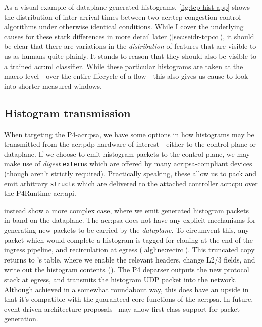 As a visual example of dataplane-generated histograms, \cref{fig:tcp-hist-app} shows the distribution of inter-arrival times between two \gls{acr:tcp} congestion control algorithms under otherwise identical conditions.
While I cover the underlying causes for these stark differences in more detail later (\cref{sec:seidr-tcpcc}), it should be clear that there are variations in the \emph{distribution} of features that are visible to us as humans quite plainly.
It stands to reason that they should also be visible to a trained \gls{acr:ml} classifier.
While these particular histograms are taken at the macro level---over the entire lifecycle of a flow---this also gives us cause to look into shorter measured windows.

\subsection{Histogram transmission}\label{sec:seidr-histo-tx}
When targeting the P4-\gls{acr:psa}, we have some options in how histograms may be transmitted from the \gls{acr:pdp} hardware of interest---either to the control plane or dataplane.
If we choose to emit histogram packets to the control plane, we may make use of \emph{digest} \texttt{extern}s which are offered by many \gls{acr:psa}-compliant devices (though aren't strictly required).
Practically speaking, these allow us to pack and emit arbitrary \texttt{struct}s which are delivered to the attached controller \gls{acr:cpu} over the P4Runtime \gls{acr:api}.

 instead show a more complex case, where we emit generated histogram packets in-band on the dataplane.
The \gls{acr:psa} does not have any explicit mechanisms for generating new packets to be carried by the \emph{dataplane}.
To circumvent this, any packet which would complete a histogram is tagged for cloning at the end of the ingress pipeline, and recirculation at egress (\cref{algline:recirc}).
This truncated copy returns to \seidr{}'s table, where we enable the relevant headers, change L2/3 fields, and write out the histogram contents ().
The P4 deparser outputs the new protocol stack at egress, and transmits the histogram UDP packet into the network.
Although achieved in a somewhat roundabout way, this does have an upside in that it's compatible with the guaranteed core functions of the \gls{acr:psa}.
In future, event-driven architecture proposals~\parencite{DBLP:conf/hotnets/IbanezABM19} may allow first-class support for packet generation.

